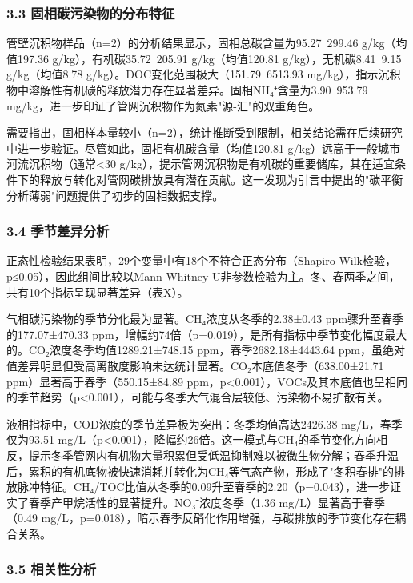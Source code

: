 \subsubsection{3.3 固相碳污染物的分布特征}

管壁沉积物样品（n=2）的分析结果显示，固相总碳含量为95.27~299.46 g/kg（均值197.36 g/kg），有机碳35.72~205.91 g/kg（均值120.81 g/kg），无机碳8.41~9.15 g/kg（均值8.78 g/kg）。DOC变化范围极大（151.79~6513.93 mg/kg），指示沉积物中溶解性有机碳的释放潜力存在显著差异。固相NH₄⁺含量为3.90~953.79 mg/kg，进一步印证了管网沉积物作为氮素"源-汇"的双重角色。

需要指出，固相样本量较小（n=2），统计推断受到限制，相关结论需在后续研究中进一步验证。尽管如此，固相有机碳含量（均值120.81 g/kg）远高于一般城市河流沉积物（通常<30 g/kg），提示管网沉积物是有机碳的重要储库，其在适宜条件下的释放与转化对管网碳排放具有潜在贡献。这一发现为引言中提出的"碳平衡分析薄弱"问题提供了初步的固相数据支撑。

\subsubsection{3.4 季节差异分析}

正态性检验结果表明，29个变量中有18个不符合正态分布（Shapiro-Wilk检验，p≤0.05），因此组间比较以Mann-Whitney U非参数检验为主。冬、春两季之间，共有10个指标呈现显著差异（表X）。

气相碳污染物的季节分化最为显著。CH₄浓度从冬季的2.38±0.43 ppm骤升至春季的177.07±470.33 ppm，增幅约74倍（p=0.019），是所有指标中季节变化幅度最大的。CO₂浓度冬季均值1289.21±748.15 ppm，春季2682.18±4443.64 ppm，虽绝对值差异明显但受高离散度影响未达统计显著。CO₂本底值冬季（638.00±21.71 ppm）显著高于春季（550.15±84.89 ppm，p<0.001），VOCs及其本底值也呈相同的季节趋势（p<0.001），可能与冬季大气混合层较低、污染物不易扩散有关。

液相指标中，COD浓度的季节差异极为突出：冬季均值高达2426.38 mg/L，春季仅为93.51 mg/L（p<0.001），降幅约26倍。这一模式与CH₄的季节变化方向相反，提示冬季管网内有机物大量积累但受低温抑制难以被微生物分解；春季升温后，累积的有机底物被快速消耗并转化为CH₄等气态产物，形成了"冬积春排"的排放脉冲特征。CH₄/TOC比值从冬季的0.09升至春季的2.20（p=0.043），进一步证实了春季产甲烷活性的显著提升。NO₃⁻浓度冬季（1.36 mg/L）显著高于春季（0.49 mg/L，p=0.018），暗示春季反硝化作用增强，与碳排放的季节变化存在耦合关系。

\subsubsection{3.5 相关性分析}

